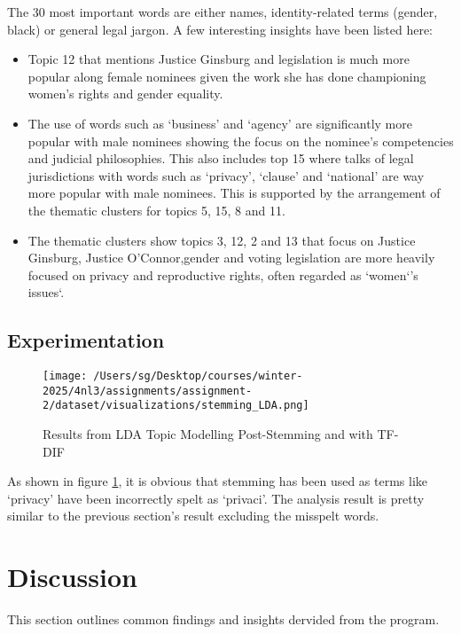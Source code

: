 \documentclass[titlepage]{article}
\begin{document}
The 30 most important words are either names, identity-related terms (gender, black) or general legal jargon. A few interesting insights have been listed here:
\begin{itemize}
    \item Topic 12 that mentions Justice Ginsburg and legislation is much more popular along female nominees given the work she has done championing women's rights 
    and gender equality.
    \item The use of words such as `business' and `agency' are significantly more popular with male nominees showing the focus on the nominee's competencies and
    judicial philosophies. This also includes top 15 where talks of legal jurisdictions with words such as `privacy', `clause' and `national' are way more popular 
    with male nominees. This is supported by the arrangement of the thematic clusters for topics 5, 15, 8 and 11.
    \item The thematic clusters show topics 3, 12, 2 and 13 that focus on Justice Ginsburg, Justice O'Connor,gender and voting legislation are more heavily focused on 
    privacy and reproductive rights, often regarded as `women`'s issues`.
\end{itemize}

\subsection{Experimentation}
\begin{figure}[H] \label{fig:stemming}
    \centering
    \texttt{[image: /Users/sg/Desktop/courses/winter-2025/4nl3/assignments/assignment-2/dataset/visualizations/stemming\_LDA.png]}
    \caption{Results from LDA Topic Modelling Post-Stemming and with TF-DIF}
\end{figure}

As shown in figure \ref{fig:stemming}, it is obvious that stemming has been used as terms like `privacy' have been incorrectly spelt as `privaci'.
The analysis result is pretty similar to the previous section's result excluding the misspelt words.

\section{Discussion}

This section outlines common findings and insights dervided from the program.
\end{document}
